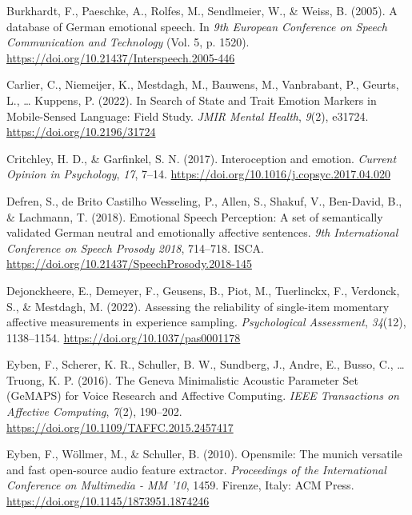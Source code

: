 \documentclass[
  english,
  man,floatsintext]{apa6}
\newlength{\cslhangindent}
\newenvironment{CSLReferences}[2] %
 {%
  \setlength{\parindent}{0pt}
  \ifodd #1 \everypar{\setlength{\hangindent}{\cslhangindent}}\ignorespaces\fi
  \ifnum #2 > 0
  \setlength{\parskip}{#2\baselineskip}
  \fi
 }%
 {}
\begin{document}
\begin{CSLReferences}{1}{0}
\leavevmode{}%
Burkhardt, F., Paeschke, A., Rolfes, M., Sendlmeier, W., \& Weiss, B. (2005). A database of {German} emotional speech. In \emph{9th European Conference on Speech Communication and Technology} (Vol. 5, p. 1520). \url{https://doi.org/10.21437/Interspeech.2005-446}

\leavevmode{}%
Carlier, C., Niemeijer, K., Mestdagh, M., Bauwens, M., Vanbrabant, P., Geurts, L., \ldots{} Kuppens, P. (2022). In {Search} of {State} and {Trait Emotion Markers} in {Mobile-Sensed Language}: {Field Study}. \emph{JMIR Mental Health}, \emph{9}(2), e31724. \url{https://doi.org/10.2196/31724}

\leavevmode{}%
Critchley, H. D., \& Garfinkel, S. N. (2017). Interoception and emotion. \emph{Current Opinion in Psychology}, \emph{17}, 7--14. \url{https://doi.org/10.1016/j.copsyc.2017.04.020}

\leavevmode{}%
Defren, S., de Brito Castilho Wesseling, P., Allen, S., Shakuf, V., Ben-David, B., \& Lachmann, T. (2018). Emotional {Speech Perception}: {A} set of semantically validated {German} neutral and emotionally affective sentences. \emph{9th {International Conference} on {Speech Prosody} 2018}, 714--718. ISCA. \url{https://doi.org/10.21437/SpeechProsody.2018-145}

\leavevmode{}%
Dejonckheere, E., Demeyer, F., Geusens, B., Piot, M., Tuerlinckx, F., Verdonck, S., \& Mestdagh, M. (2022). Assessing the reliability of single-item momentary affective measurements in experience sampling. \emph{Psychological Assessment}, \emph{34}(12), 1138--1154. \url{https://doi.org/10.1037/pas0001178}

\leavevmode{}%
Eyben, F., Scherer, K. R., Schuller, B. W., Sundberg, J., Andre, E., Busso, C., \ldots{} Truong, K. P. (2016). The {Geneva Minimalistic Acoustic Parameter Set} ({GeMAPS}) for {Voice Research} and {Affective Computing}. \emph{IEEE Transactions on Affective Computing}, \emph{7}(2), 190--202. \url{https://doi.org/10.1109/TAFFC.2015.2457417}

\leavevmode{}%
Eyben, F., Wöllmer, M., \& Schuller, B. (2010). Opensmile: The munich versatile and fast open-source audio feature extractor. \emph{Proceedings of the International Conference on {Multimedia} - {MM} '10}, 1459. Firenze, Italy: ACM Press. \url{https://doi.org/10.1145/1873951.1874246}


\end{CSLReferences}
\end{document}
